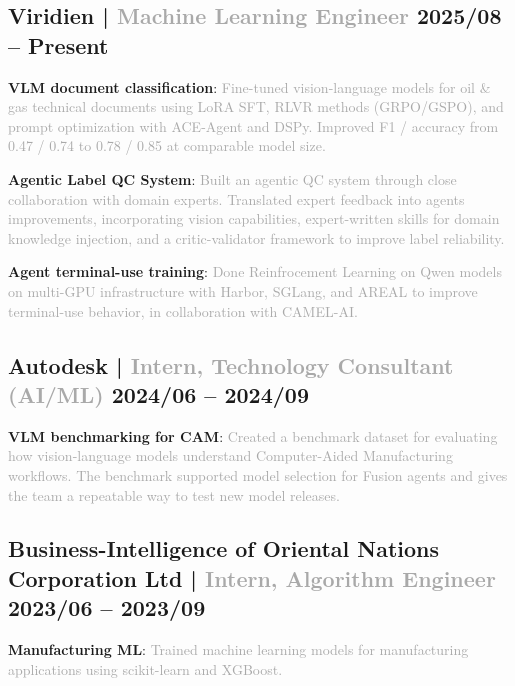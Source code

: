\subsection{{Viridien | \textcolor{darkgray}{Machine Learning Engineer} \hfill 2025/08 -- Present}}
\begin{zitemize}
\item \textbf{VLM document classification}: \textcolor{darkgray}{Fine-tuned vision-language models for oil \& gas technical documents using LoRA SFT, RLVR methods (GRPO/GSPO), and prompt optimization with ACE-Agent and DSPy. Improved F1 / accuracy from 0.47 / 0.74 to 0.78 / 0.85 at comparable model size.}
\item \textbf{Agentic Label QC System}: \textcolor{darkgray}{Built an agentic QC system through close collaboration with domain experts. Translated expert feedback into agents improvements, incorporating vision capabilities, expert-written skills for domain knowledge injection, and a critic-validator framework to improve label reliability.}
\item \textbf{Agent terminal-use training}: \textcolor{darkgray}{Done Reinfrocement Learning on Qwen models on multi-GPU infrastructure with Harbor, SGLang, and AREAL to improve terminal-use behavior, in collaboration with CAMEL-AI.}
\end{zitemize}

\subsection{{Autodesk | \textcolor{darkgray}{Intern, Technology Consultant (AI/ML)} \hfill 2024/06 -- 2024/09}}
\begin{zitemize}
\item \textbf{VLM benchmarking for CAM}: \textcolor{darkgray}{Created a benchmark dataset for evaluating how vision-language models understand Computer-Aided Manufacturing workflows. The benchmark supported model selection for Fusion agents and gives the team a repeatable way to test new model releases.}
\end{zitemize}


\subsection{{Business-Intelligence of Oriental Nations Corporation Ltd | \textcolor{darkgray}{Intern, Algorithm Engineer} \hfill 2023/06 -- 2023/09}}
\begin{zitemize}
\item \textbf{Manufacturing ML}: \textcolor{darkgray}{Trained machine learning models for manufacturing applications using scikit-learn and XGBoost.}
\end{zitemize}


